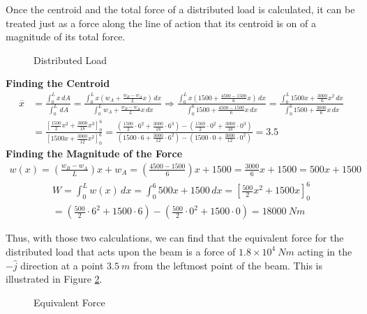 \documentclass[12pt]{article}
\begin{document}
Once the centroid and the total force of a distributed load is calculated, it can be treated
just as a force along the line of action that its centroid is on of a magnitude of its
total force.
\begin{figure}[H]
  \centering
  
  \caption{Distributed Load}
  \label{fig:017}
\end{figure}
{\large \textbf{Finding the Centroid}}
\begin{align*}
  \overline{x} &= \frac{\int_{0}^{L} x \,dA}{\int_{0}^{L}  \,dA} = \frac{\int_{0}^{L} x \left(w_A + \frac{w_B - w_A}{L}x\right) \,dx}{\int_{0}^{L} {w_A + \frac{w_B - w_A}{L}x} \,dx} \Rightarrow \frac{\int_{0}^{L} x \left(1500 + \frac{4500 - 1500}{6}x\right) \,dx}{\int_{0}^{6} {1500 + \frac{4500 - 1500}{6}x} \,dx} = \frac{\int_{0}^{L} 1500x + \frac{3000}{6}x^2 \,dx}{\int_{0}^{6} {1500 + \frac{3000}{6}x} \,dx} \\
               &= \frac{\left[\frac{1500}{2}x^2 + \frac{3000}{18}x^3\right]_{0}^{6}}{\left[1500x + \frac{3000}{12}x^2\right]_{0}^{6}} = \frac{\left(\frac{1500}{2}\cdot6^2 + \frac{3000}{18}\cdot6^3\right)-\left(\frac{1500}{2}\cdot0^2 + \frac{3000}{18}\cdot0^3\right)}{\left(1500\cdot6 + \frac{3000}{12}\cdot6^2\right)-\left(1500\cdot0 + \frac{3000}{12}\cdot0^2\right)} = 3.5
\end{align*}
{\large \textbf{Finding the Magnitude of the Force}}
\begin{align*}
  w(x) = \left(\frac{w_B - w_A}{L}\right)x + w_A = \left(\frac{4500 - 1500}{6}\right)x + 1500 = \frac{3000}{6}x + 1500 = 500x + 1500
\end{align*}
\begin{gather*}
  W = \int_{0}^{L} w(x) \,dx = \int_{0}^{6} 500x + 1500 \,dx = \left[\frac{500}{2}x^2 + 1500x\right]_{0}^{6} \\
  = \left(\frac{500}{2}\cdot6^2 + 1500 \cdot 6\right)-\left(\frac{500}{2}\cdot0^2 + 1500 \cdot 0\right) = 18000\ Nm
\end{gather*}

Thus, with those two calculations, we can find that the equivalent force for the distributed
load that acts upon the beam is a force of $1.8 \times 10^4\ Nm$ acting in the $-\hat{j}$ direction
at a point $3.5\ m$ from the leftmost point of the beam. This is illustrated in Figure \ref{fig:019}.
\begin{figure}[H]
  \centering
  
  \caption{Equivalent Force}
  \label{fig:019}
\end{figure}
\end{document}

